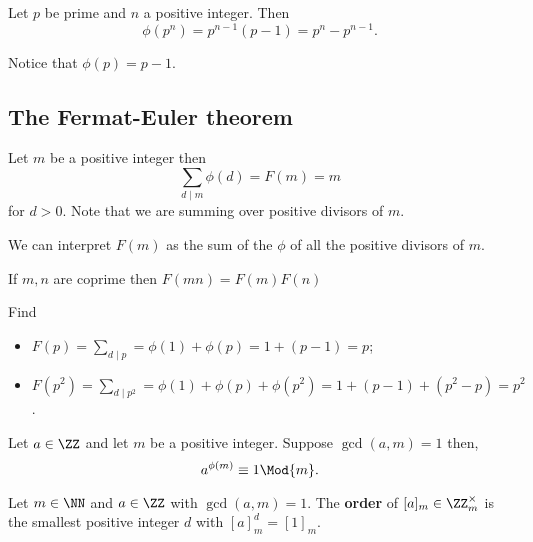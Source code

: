 \documentclass[12pt, a4paper]{article}
\begin{document}
\begin{mdlemma}
    Let \(p\) be prime and \(n\) a positive integer. Then 
    \[
        \phi(p^n)=p^{n-1}(p-1) = p^n-p^{n-1}.
    \]
\end{mdlemma}

\begin{mdremark}
    Notice that \(\phi(p) = p-1\).
\end{mdremark}

\subsection{The Fermat-Euler theorem}

\begin{proposition}
    Let \(m\) be a positive integer then 
    \[
        \sum_{d \mid m} \phi(d)= F(m) =m
    \]
    for \(d>0\). Note that we are summing over positive divisors of \(m\).
\end{proposition}

\begin{mdnote}
    We can interpret \(F(m)\) as the sum of the \(\phi\) of all the positive divisors of \(m\).
\end{mdnote}

\begin{mdremark}
    If \(m,n\) are coprime then \(F(mn)=F(m)F(n)\)
\end{mdremark}

\begin{example}
    Find 
    \begin{itemize}
        \item \(F(p) = \sum_{d\mid p} = \phi(1)+\phi(p)=1+(p-1)=p\);
        \item \(F(p^2) = \sum_{d \mid p^2} =\phi(1)+\phi(p)+\phi(p^2) = 1+(p-1)+(p^2-p)=p^2\).
    \end{itemize}
\end{example}

\begin{mdthm}
    Let \(a \in \ZZ\) and let \(m\) be a positive integer. Suppose \(\gcd(a,m) = 1\) then,
    \[
        a^{\phi(m)} \equiv 1 \Mod{m}.
    \]
\end{mdthm}

\begin{definition}
    Let \(m\in \NN\) and \(a\in \ZZ\) with \(\gcd(a,m)=1\). The \textbf{order} of \([a]_m\in \ZZ^{\times}_m\) is the smallest positive integer \(d\) with \([a]^d_m=[1]_m\).
\end{definition}
\end{document}
